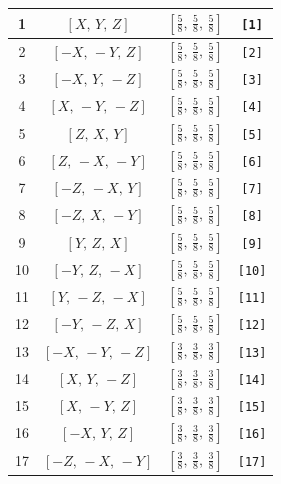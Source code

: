 \documentclass[fleqn,8pt]{jsarticle}
\begin{document}
\begin{longtable}{cccc}
1 & $\left[ X,\, Y,\, Z \right]$ & $\left[ \frac{5}{8},\, \frac{5}{8},\, \frac{5}{8} \right]$ & {\tt [1]} \\ \hline
2 & $\left[ - X,\, - Y,\, Z \right]$ & $\left[ \frac{5}{8},\, \frac{5}{8},\, \frac{5}{8} \right]$ & {\tt [2]} \\ \hline
3 & $\left[ - X,\, Y,\, - Z \right]$ & $\left[ \frac{5}{8},\, \frac{5}{8},\, \frac{5}{8} \right]$ & {\tt [3]} \\ \hline
4 & $\left[ X,\, - Y,\, - Z \right]$ & $\left[ \frac{5}{8},\, \frac{5}{8},\, \frac{5}{8} \right]$ & {\tt [4]} \\ \hline
5 & $\left[ Z,\, X,\, Y \right]$ & $\left[ \frac{5}{8},\, \frac{5}{8},\, \frac{5}{8} \right]$ & {\tt [5]} \\ \hline
6 & $\left[ Z,\, - X,\, - Y \right]$ & $\left[ \frac{5}{8},\, \frac{5}{8},\, \frac{5}{8} \right]$ & {\tt [6]} \\ \hline
7 & $\left[ - Z,\, - X,\, Y \right]$ & $\left[ \frac{5}{8},\, \frac{5}{8},\, \frac{5}{8} \right]$ & {\tt [7]} \\ \hline
8 & $\left[ - Z,\, X,\, - Y \right]$ & $\left[ \frac{5}{8},\, \frac{5}{8},\, \frac{5}{8} \right]$ & {\tt [8]} \\ \hline
9 & $\left[ Y,\, Z,\, X \right]$ & $\left[ \frac{5}{8},\, \frac{5}{8},\, \frac{5}{8} \right]$ & {\tt [9]} \\ \hline
10 & $\left[ - Y,\, Z,\, - X \right]$ & $\left[ \frac{5}{8},\, \frac{5}{8},\, \frac{5}{8} \right]$ & {\tt [10]} \\ \hline
11 & $\left[ Y,\, - Z,\, - X \right]$ & $\left[ \frac{5}{8},\, \frac{5}{8},\, \frac{5}{8} \right]$ & {\tt [11]} \\ \hline
12 & $\left[ - Y,\, - Z,\, X \right]$ & $\left[ \frac{5}{8},\, \frac{5}{8},\, \frac{5}{8} \right]$ & {\tt [12]} \\ \hline
13 & $\left[ - X,\, - Y,\, - Z \right]$ & $\left[ \frac{3}{8},\, \frac{3}{8},\, \frac{3}{8} \right]$ & {\tt [13]} \\ \hline
14 & $\left[ X,\, Y,\, - Z \right]$ & $\left[ \frac{3}{8},\, \frac{3}{8},\, \frac{3}{8} \right]$ & {\tt [14]} \\ \hline
15 & $\left[ X,\, - Y,\, Z \right]$ & $\left[ \frac{3}{8},\, \frac{3}{8},\, \frac{3}{8} \right]$ & {\tt [15]} \\ \hline
16 & $\left[ - X,\, Y,\, Z \right]$ & $\left[ \frac{3}{8},\, \frac{3}{8},\, \frac{3}{8} \right]$ & {\tt [16]} \\ \hline
17 & $\left[ - Z,\, - X,\, - Y \right]$ & $\left[ \frac{3}{8},\, \frac{3}{8},\, \frac{3}{8} \right]$ & {\tt [17]} \\ \hline

\end{longtable}
\end{document}
